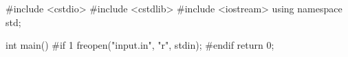 #include <cstdio>
#include <cstdlib>
#include <iostream>
using namespace std;

int main() {
#if 1
  freopen("input.in", "r", stdin);
#endif
  return 0;
}
